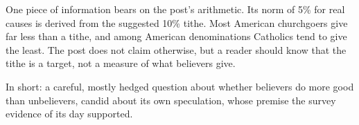 \begin{afterword}
One piece of information bears on the post's arithmetic. Its norm of 5\% for real causes is derived from the suggested 10\% tithe. Most American churchgoers give far less than a tithe, and among American denominations Catholics tend to give the least. The post does not claim otherwise, but a reader should know that the tithe is a target, not a measure of what believers give.

In short: a careful, mostly hedged question about whether believers do more good than unbelievers, candid about its own speculation, whose premise the survey evidence of its day supported.
\end{afterword}
